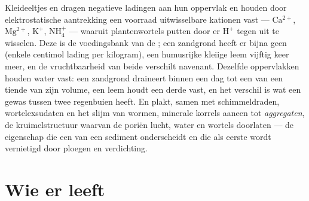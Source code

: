 \begin{proposition}\label{prop:b2:living-soil:cec}
Kleideeltjes en  dragen negatieve ladingen aan hun oppervlak en houden
door elektrostatische aantrekking een voorraad uitwisselbare kationen vast
--- $\mathrm{Ca^{2+}}$, $\mathrm{Mg^{2+}}$, $\mathrm{K^{+}}$, $\mathrm{NH_4^{+}}$ --- waaruit
plantenwortels putten door er $\mathrm{H^{+}}$ tegen uit te wisselen. Deze
\emph{} is de voedingsbank van de ; een
zandgrond heeft er bijna geen (enkele centimol lading per kilogram), een
humusrijke kleiige leem vijftig keer meer, en de vruchtbaarheid van beide
verschilt navenant. Dezelfde oppervlakken houden water vast: een zandgrond
draineert binnen een dag tot een \emph{} van een tiende van zijn
volume, een leem houdt een derde vast, en het verschil is wat een gewas tussen
twee regenbuien heeft. En  plakt, samen met schimmeldraden,
wortelexsudaten en het slijm van wormen, minerale korrels aaneen tot
\emph{aggregaten}, de kruimelstructuur waarvan de poriën lucht, water en
wortels doorlaten --- de eigenschap die een  van een sediment
onderscheidt en die als eerste wordt vernietigd door ploegen en verdichting.
\end{proposition}

\section{Wie er leeft}

